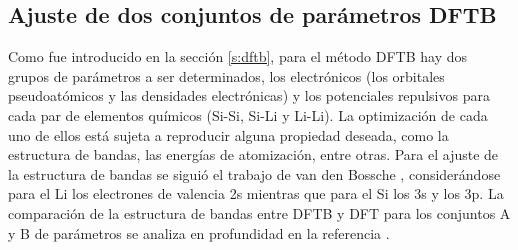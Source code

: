 \subsection{Ajuste de dos conjuntos de parámetros DFTB}

Como fue introducido en la sección \ref{s:dftb}, para el método DFTB hay dos 
grupos de parámetros a ser determinados, los electrónicos (los orbitales 
pseudoatómicos y las densidades electrónicas) y los potenciales repulsivos para 
cada par de elementos químicos (Si-Si, Si-Li y Li-Li). La optimización de cada 
uno de ellos está sujeta a reproducir alguna propiedad deseada, como la 
estructura de bandas, las energías de atomización, entre otras. Para el ajuste
de la estructura de bandas se siguió el trabajo de van den Bossche \cite{van2019},
considerándose para el Li los electrones de valencia 2s mientras que para el Si 
los 3s y los 3p. La comparación de la estructura de bandas entre DFTB y DFT para 
los conjuntos A y B de parámetros se analiza en profundidad en la referencia 
\cite{oviedo2023}.


